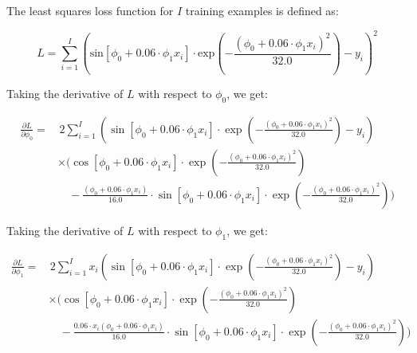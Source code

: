 \documentclass[12pt]{report}
\begin{document}
The least squares loss function for $I$ training examples is defined as:

\begin{equation*}
    L = \sum_{i=1}^{I} (\text{sin}[\phi_{0} + 0.06\cdot\phi_{1}x_{i}]\cdot\text{exp}\left(-\frac{(\phi_{0} + 0.06\cdot\phi_{1}x_{i})^{2}}{32.0}\right) - y_{i})^2
\end{equation*}

Taking the derivative of $L$ with respect to $\phi_{0}$, we get:

\begin{align*}
    \frac{\partial L}{\partial \phi_{0}} = & \, 2\sum_{i=1}^{I} \left(\sin[\phi_{0} + 0.06\cdot\phi_{1}x_{i}]\cdot\exp\left(-\frac{(\phi_{0} + 0.06\cdot\phi_{1}x_{i})^{2}}{32.0}\right) - y_{i}\right)                            \\
                                           & \times \Bigg(\cos[\phi_{0} + 0.06\cdot\phi_{1}x_{i}]\cdot\exp\left(-\frac{(\phi_{0} + 0.06\cdot\phi_{1}x_{i})^{2}}{32.0}\right)                                                       \\
                                           & \quad - \frac{(\phi_{0} + 0.06\cdot\phi_{1}x_{i})}{16.0}\cdot\sin[\phi_{0} + 0.06\cdot\phi_{1}x_{i}]\cdot\exp\left(-\frac{(\phi_{0} + 0.06\cdot\phi_{1}x_{i})^{2}}{32.0}\right)\Bigg)
\end{align*}

Taking the derivative of $L$ with respect to $\phi_{1}$, we get:

\begin{align*}
    \frac{\partial L}{\partial \phi_{1}} = & \, 2\sum_{i=1}^{I} x_{i} \left(\sin[\phi_{0} + 0.06\cdot\phi_{1}x_{i}]\cdot\exp\left(-\frac{(\phi_{0} + 0.06\cdot\phi_{1}x_{i})^{2}}{32.0}\right) - y_{i}\right)                                     \\
                                           & \times \Bigg(\cos[\phi_{0} + 0.06\cdot\phi_{1}x_{i}]\cdot\exp\left(-\frac{(\phi_{0} + 0.06\cdot\phi_{1}x_{i})^{2}}{32.0}\right)                                                                      \\
                                           & \quad - \frac{0.06\cdot x_{i}(\phi_{0} + 0.06\cdot\phi_{1}x_{i})}{16.0}\cdot\sin[\phi_{0} + 0.06\cdot\phi_{1}x_{i}]\cdot\exp\left(-\frac{(\phi_{0} + 0.06\cdot\phi_{1}x_{i})^{2}}{32.0}\right)\Bigg)
\end{align*}
\end{document}
